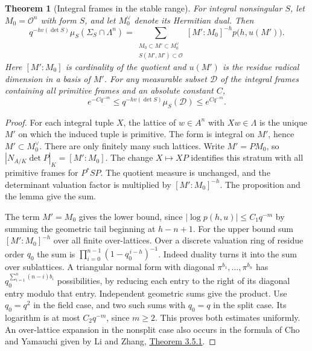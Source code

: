 \documentclass[a4paper,11pt]{article}
\newtheorem{theorem}[proposition]{Theorem}
\theoremstyle{definition}
\theoremstyle{remark}
\numberwithin{equation}{section}
\begin{document}
\begin{theorem}[Integral frames in the stable range]\label{thm:saturate215}
For integral nonsingular \(S\), let \(M_0=\mathcal O^n\) with
form \(S\), and let \(M_0^\vee\) denote its Hermitian dual. Then
\[
 q^{-h v(\det S)}\mu_S(\Sigma_S\cap\Lambda^n)
   =\sum_{\substack{M_0\subset M'\subset M_0^\vee\\ S(M',M')\subset\mathcal O}}
       [M':M_0]^{-h}p\bigl(h,u(M')\bigr).
\]
Here \([M':M_0]\) is cardinality of the quotient and \(u(M')\)
is the residue radical dimension in a basis of \(M'\). For any
measurable subset \(\mathcal D\) of the integral frames containing
all primitive frames and an absolute constant \(C\),
\begin{equation}
 e^{-Cq^{-m}}\le q^{-h v(\det S)}\mu_S(\mathcal D)
                                    \le e^{Cq^{-m}} . \label{eq:fibre215}
\end{equation}
\end{theorem}
\begin{proof}
For each integral tuple \(X\), the lattice of \(w\in A^n\)
with \(Xw\in\Lambda\) is the unique \(M'\) on which the induced
tuple is primitive. The form is integral on \(M'\), hence
\(M'\subset M_0^\vee\). There are only finitely many such
lattices. Write \(M'=PM_0\), so \(|N_{A/K}\det P|_K=[M':M_0]\).
The change \(X\mapsto XP\) identifies this stratum with all
primitive frames for \(P^*SP\). The quotient measure is
unchanged, and the determinant valuation factor is multiplied by
\([M':M_0]^{-h}\). The proposition and the lemma give the sum.

The term \(M'=M_0\) gives the lower bound, since
\(\lvert\log p(h,u)\rvert\le C_1 q^{-m}\) by summing the
geometric tail beginning at \(h-n+1\). For the upper bound sum
\([M':M_0]^{-h}\) over all finite over-lattices. Over a discrete
valuation ring of residue order \(q_0\) the sum is
\(\prod_{i=0}^{n-1}(1-q_0^{\,i-h})^{-1}\). Indeed duality
turns it into the sum over sublattices. A triangular normal
form with diagonal \(\pi^{b_1},\ldots,\pi^{b_n}\) has
\(q_0^{\sum_{i=1}^n(n-i)b_i}\) possibilities, by reducing
each entry to the right of its diagonal entry modulo that entry.
Independent geometric sums give the product. Use \(q_0=q^2\)
in the field case, and two such sums with \(q_0=q\) in the
split case. Its logarithm is at most \(C_2q^{-m}\), since
\(m\ge2\). This proves both estimates uniformly. An over-lattice
expansion in the nonsplit case also occurs in the formula of
Cho and Yamauchi given by Li and Zhang,
\href{https://arxiv.org/abs/1908.01701}{Theorem 3.5.1}.
\end{proof}
\end{document}
